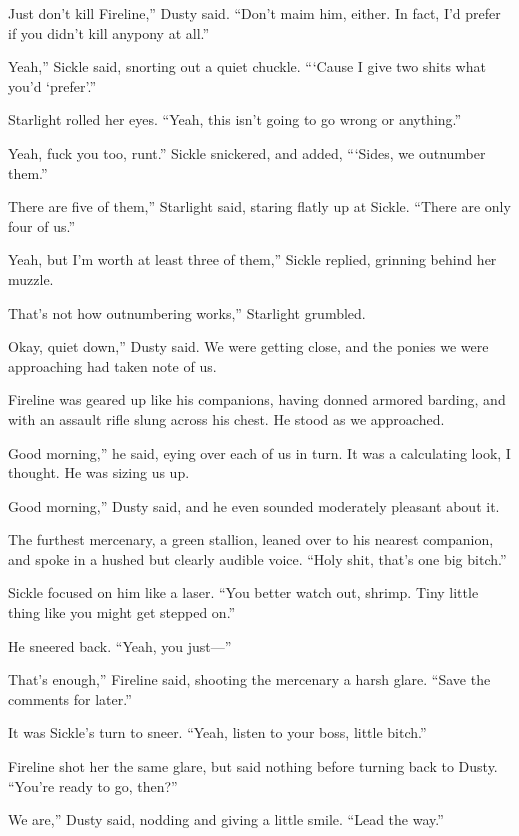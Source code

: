 \leavevmode{}Just don’t kill Fireline,” Dusty said. “Don’t maim him, either. In fact, I’d prefer if you didn’t kill anypony at all.”

\leavevmode{}Yeah,” Sickle said, snorting out a quiet chuckle. “‘Cause I give two shits what you’d ‘prefer’.”

Starlight rolled her eyes. “Yeah, this isn’t going to go wrong or anything.”

\leavevmode{}Yeah, fuck you too, runt.” Sickle snickered, and added, “‘Sides, we outnumber them.”

\leavevmode{}There are five of them,” Starlight said, staring flatly up at Sickle. “There are only four of us.”

\leavevmode{}Yeah, but I’m worth at least three of them,” Sickle replied, grinning behind her muzzle.

\leavevmode{}That’s not how outnumbering works,” Starlight grumbled.

\leavevmode{}Okay, quiet down,” Dusty said. We were getting close, and the ponies we were approaching had taken note of us.

Fireline was geared up like his companions, having donned armored barding, and with an assault rifle slung across his chest. He stood as we approached.

\leavevmode{}Good morning,” he said, eying over each of us in turn. It was a calculating look, I thought. He was sizing us up.

\leavevmode{}Good morning,” Dusty said, and he even sounded moderately pleasant about it.

The furthest mercenary, a green stallion, leaned over to his nearest companion, and spoke in a hushed but clearly audible voice. “Holy shit, that’s one big bitch.”

Sickle focused on him like a laser. “You better watch out, shrimp. Tiny little thing like you might get stepped on.”

He sneered back. “Yeah, you just—”

\leavevmode{}That’s enough,” Fireline said, shooting the mercenary a harsh glare. “Save the comments for later.”

It was Sickle’s turn to sneer. “Yeah, listen to your boss, little bitch.”

Fireline shot her the same glare, but said nothing before turning back to Dusty. “You’re ready to go, then?”

\leavevmode{}We are,” Dusty said, nodding and giving a little smile. “Lead the way.”


